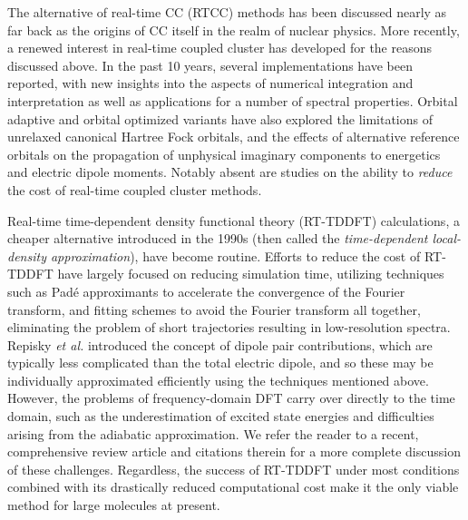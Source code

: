 The alternative of real-time CC (RTCC) methods has been discussed
nearly as far back as the origins of CC itself in the realm of nuclear
physics.\cite{Hoodbhoy1978,Hoodbhoy1979,Gunnarsson78} More recently, a
renewed interest in real-time coupled cluster has developed for the reasons
discussed above. In the past 10 years, several implementations have been
reported, \cite{Huber2011,Kvaal2012,Nascimento2019,Pedersen2019,Park2019}
with new insights into the aspects of numerical
integration\cite{Pedersen2019,Kristiansen2020} and
interpretation\cite{Pedersen2019,Pedersen2021} as
well as applications for a number of spectral properties.
\cite{Nascimento2016,Nascimento2017,Nascimento2019,Park2019,Park2021b}
Orbital adaptive\cite{Kvaal2012} and orbital optimized\cite{Sato2018}
variants have also explored the limitations of unrelaxed canonical
Hartree Fock orbitals, and the effects of alternative reference
orbitals on the propagation of unphysical imaginary components to
energetics and electric dipole moments. 
Notably absent are studies
on the ability to \textit{reduce} the cost of real-time coupled
cluster methods. 

Real-time time-dependent density functional theory
(RT-TDDFT) calculations, a cheaper alternative introduced in the 1990s
(then called the \textit{time-dependent local-density approximation}),
\cite{Yabana1996,Yabana1997,Yabana1999,Bertsch2000} have become routine.
\cite{Lopata2011,Castro2015,Tussupbayev2015,Goings2016a,Bruner2016,Goings2018,Sun2019a,Li2020}
Efforts to reduce the cost of RT-TDDFT have largely focused on reducing
simulation time, utilizing techniques such as Pad\'e approximants to
accelerate the convergence of the Fourier transform,\cite{Bruner2016}
and fitting schemes to avoid the Fourier transform all together,
eliminating the problem of short trajectories resulting in low-resolution
spectra.\cite{Ding2013} Repisky \textit{et al.} introduced the concept of 
dipole pair contributions,\cite{Repisky2015,Kadek2015}
which are typically less complicated than the total electric dipole,
and so these may be individually approximated efficiently using the 
techniques mentioned above.   
\cite{Bruner2016} However, the problems of frequency-domain DFT carry
over directly to the time domain, such as the underestimation of excited
state energies\cite{Peach2008} and difficulties arising from the adiabatic
approximation.\cite{Fuks2013,Fuks2015,Bruner2016} We refer the reader to
a recent, comprehensive review article\cite{Li2020} and citations therein
for a more complete discussion of these challenges. Regardless, the success
of RT-TDDFT under most conditions combined with its drastically reduced
computational cost make it the only viable method for large molecules
at present.

